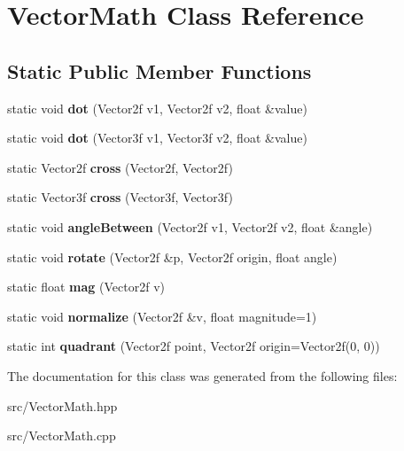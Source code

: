 \hypertarget{class_vector_math}{}\section{Vector\+Math Class Reference}
\label{class_vector_math}
\subsection*{Static Public Member Functions}
\begin{DoxyCompactItemize}
\item 
\mbox{\label{class_vector_math_ab7feb7163643f293264e51233fbcee4d}} 
static void {\bfseries dot} (Vector2f v1, Vector2f v2, float \&value)
\item 
\mbox{\label{class_vector_math_af89936fd293c39ce91711a4ee51041d8}} 
static void {\bfseries dot} (Vector3f v1, Vector3f v2, float \&value)
\item 
\mbox{\label{class_vector_math_aa333f14c9aaa2282ebf685e22d5a349d}} 
static Vector2f {\bfseries cross} (Vector2f, Vector2f)
\item 
\mbox{\label{class_vector_math_a8b19d8b931829c0e77672ce9d98cc7a2}} 
static Vector3f {\bfseries cross} (Vector3f, Vector3f)
\item 
\mbox{\label{class_vector_math_a0dfedf93cc0e354fc5988c2899e5e3e2}} 
static void {\bfseries angle\+Between} (Vector2f v1, Vector2f v2, float \&angle)
\item 
\mbox{\label{class_vector_math_a3b0826708334176a87bb42379724e1a9}} 
static void {\bfseries rotate} (Vector2f \&p, Vector2f origin, float angle)
\item 
\mbox{\label{class_vector_math_aeed3d06db6a54a94bdfd3224eba499c9}} 
static float {\bfseries mag} (Vector2f v)
\item 
\mbox{\label{class_vector_math_a0c779539ea6f776b1628c48df66d2f54}} 
static void {\bfseries normalize} (Vector2f \&v, float magnitude=1)
\item 
\mbox{\label{class_vector_math_a2292b414d13f5c07f3d3d3764e68584f}} 
static int {\bfseries quadrant} (Vector2f point, Vector2f origin=Vector2f(0, 0))
\end{DoxyCompactItemize}


The documentation for this class was generated from the following files\+:\begin{DoxyCompactItemize}
\item 
src/Vector\+Math.\+hpp\item 
src/Vector\+Math.\+cpp\end{DoxyCompactItemize}

